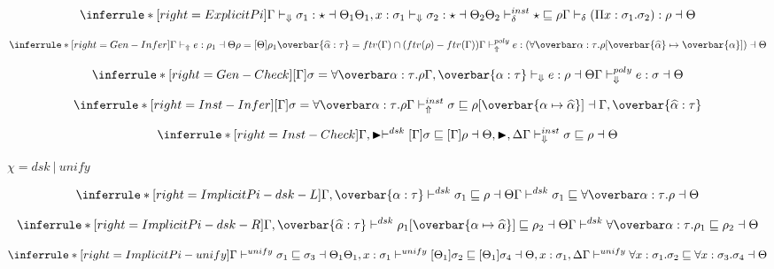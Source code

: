 \[
\inferrule*[right=ExplicitPi]
{\checktype \sigma_1 : \star \dashv \Theta_1 \\
\Theta_1, x:\sigma_1 \checktypeno \sigma_2 : \star \dashv \Theta_2 \\
\Theta_2 \instinfercheck \star \sqsubseteq \rho
}
{\infercheck (\Pi x : \sigma_1. \sigma_2) : \rho \dashv \Theta}
\]


\[
\inferrule*[right=Gen-Infer]
{\infertype e :\rho_1 \dashv \Theta\\
\rho = [\Theta]\rho_1 \\
\overbar{\widehat \alpha:\tau}=ftv(\Gamma) \cap (ftv(\rho)-ftv(\Gamma))
}
{\polyinfer e :(\forallvars{\alpha:\tau}. \rho[\overbar{\widehat \alpha} \mapsto \overbar{\alpha}]) \dashv \Theta}
\]

\[
\inferrule*[right=Gen-Check]
{
[\Gamma]\sigma = \forallvars{\alpha:\tau}. \rho \\
\Gamma, \overbar{\alpha:\tau} \checktypeno e :\rho \dashv \Theta
}
{\polycheck e : \sigma \dashv \Theta}
\]

\framebox{$ \Gamma \instinfercheck \sigma \sqsubseteq \rho$ }

\[
\inferrule*[right=Inst-Infer]
{[\Gamma] \sigma = \forallvars{\alpha:\tau}. \rho
}
{\Gamma \instinfer \sigma \sqsubseteq \rho[\overbar{\tpmapsto {\tau} \alpha {\widehat{\alpha}}}] \dashv \Gamma, \overbar{\widehat{\alpha}:\tau}}
\]

\[
\inferrule*[right=Inst-Check]
{\Gamma, \blacktriangleright \polymorphic [\Gamma]\sigma \sqsubseteq [\Gamma]\rho \dashv \Theta, \blacktriangleright, \Delta  } { \Gamma \instcheck \sigma \sqsubseteq \rho \dashv \Theta}
\]

\newcommand{\dskunify}[0]{\vdash^{\chi}}
\framebox{$ \Gamma \dskunify \sigma_1 \sqsubseteq \sigma_2$} $\chi = dsk~|~unify$

\[
\inferrule*[right=ImplicitPi-dsk-L]
{
\Gamma, \overbar{\alpha:\tau} \polymorphicstar \sigma_1 \sqsubseteq \rho \dashv \Theta}
{\Gamma \polymorphic \sigma_1 \sqsubseteq \forallvars{\alpha:\tau}. \rho \dashv \Theta}
\]

\[
\inferrule*[right=ImplicitPi-dsk-R]
{\Gamma , \overbar{\widehat \alpha : \tau} \polymorphicstar \rho_1[\overbar{\tpmapsto \tau \alpha {\widehat \alpha}}] \sqsubseteq \rho_2 \dashv \Theta}
{\Gamma \polymorphicstar \forallvars{\alpha:\tau}.\rho_1 \sqsubseteq \rho_2 \dashv \Theta}
\]

\[
\inferrule*[right=ImplicitPi-unify]
{\Gamma \unify  \sigma_1 \sqsubseteq \sigma_3 \dashv \Theta_1 \\
\Theta_1, x:\sigma_1 \unify [\Theta_1]\sigma_2 \sqsubseteq [\Theta_1]\sigma_4 \dashv \Theta, x:\sigma_1, \Delta}
{ \Gamma \unify \forall x:\sigma_1. \sigma_2 \sqsubseteq \forall x:\sigma_3. \sigma_4 \dashv \Theta}
\]

